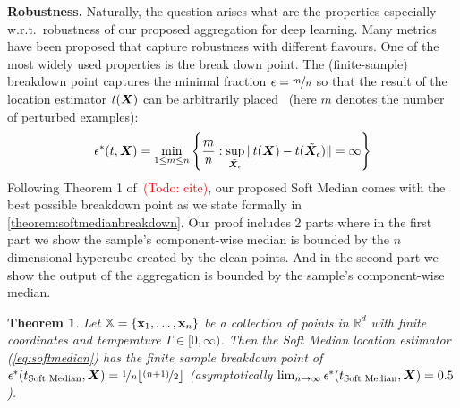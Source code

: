 \documentclass{article} %
\newcommand{\features}{\mX}
\newcommand{\featset}{\sX}
\newcommand{\pertm}{\tilde{\mX}_\epsilon}
\newtheorem{theorem}{Theorem}
\newcommand{\todo}[1]{\textcolor{red}{(Todo: #1)}}
\begin{document}
\textbf{Robustness.} Naturally, the question arises what are the properties especially w.r.t.~robustness of our proposed aggregation for deep learning. Many metrics have been proposed that capture robustness with different flavours. One of the most widely used properties is the break down point. The (finite-sample) breakdown point captures the minimal fraction \(\epsilon = \nicefrac{m}{n}\) so that the result of the location estimator \(t(\features)\) can be arbitrarily placed~\citep{Donoho1983} (here \(m\) denotes the number of perturbed examples):
%
\begin{equation}\label{eq:breakdown}
  \epsilon^*(t, \features) = \min_{1 \le m \le n} \left \{ \frac{m}{n}: \sup_{\pertm} \|t(\features)-t(\pertm)\| = \infty \right \}
\end{equation}
%
Following Theorem 1 of~\todo{cite}, our proposed Soft Median comes with the best possible breakdown point as we state formally in \autoref{theorem:softmedianbreakdown}. Our proof includes 2 parts where in the first part we show the sample's component-wise median is bounded by the $n$ dimensional hypercube created by the clean points. And in the second part we show the output of the aggregation is bounded by the sample's component-wise median.

\begin{theorem}\label{theorem:softmedianbreakdown}
  Let \(\featset = \{ \mathbf{\mathbf{x}}_1, \dots, \mathbf{\mathbf{x}}_n\} \) be a collection of points in \(\mathbb{R}^d\) with finite coordinates and temperature \(T \in [0, \infty) \). Then the Soft Median location estimator (\autoref{eq:softmedian}) has the finite sample breakdown point of \(\epsilon^*(t_{\text{Soft Median}}, \features) = \nicefrac{1}{n} \lfloor \nicefrac{(n+1)}{2}\rfloor \) (asymptotically \( \lim_{n \to \infty} \epsilon^*(t_{\text{Soft Median}}, \features) = 0.5 \)).
\end{theorem}
\end{document}
